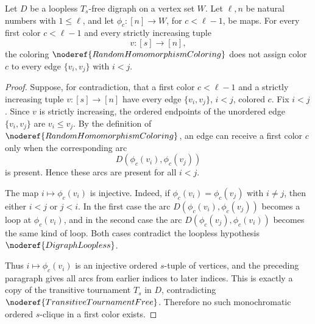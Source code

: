 \begin{helper}
Let \(D\) be a loopless \(T_s\)-free digraph on a vertex set \(W\).  Let
\(\ell,n\) be natural numbers with \(1\le\ell\), and let
\(\phi_c:[n]\to W\), for \(c<\ell-1\), be maps.  For every first color
\(c<\ell-1\) and every strictly increasing tuple
\[
  v:[s]\to[n],
\]
the coloring \(\noderef{RandomHomomorphismColoring}\) does not assign color
\(c\) to every edge \(\{v_i,v_j\}\) with \(i<j\).
\end{helper}
\begin{proof}
Suppose, for contradiction, that a first color \(c<\ell-1\) and a strictly
increasing tuple \(v:[s]\to[n]\) have every edge \(\{v_i,v_j\}\), \(i<j\),
colored \(c\).  Fix \(i<j\).  Since \(v\) is strictly increasing, the ordered
endpoints of the unordered edge \(\{v_i,v_j\}\) are \(v_i\le v_j\).  By the
definition of \(\noderef{RandomHomomorphismColoring}\), an edge can receive a
first color \(c\) only when the corresponding arc
\[
  D(\phi_c(v_i),\phi_c(v_j))
\]
is present.  Hence these arcs are present for all \(i<j\).

The map \(i\mapsto \phi_c(v_i)\) is injective.  Indeed, if
\(\phi_c(v_i)=\phi_c(v_j)\) with \(i\ne j\), then either \(i<j\) or \(j<i\).
In the first case the arc \(D(\phi_c(v_i),\phi_c(v_j))\) becomes a loop at
\(\phi_c(v_i)\), and in the second case the arc
\(D(\phi_c(v_j),\phi_c(v_i))\) becomes the same kind of loop.  Both cases
contradict the loopless hypothesis \(\noderef{DigraphLoopless}\).

Thus \(i\mapsto\phi_c(v_i)\) is an injective ordered \(s\)-tuple of vertices,
and the preceding paragraph gives all arcs from earlier indices to later
indices.  This is exactly a copy of the transitive tournament \(T_s\) in
\(D\), contradicting \(\noderef{TransitiveTournamentFree}\).  Therefore no
such monochromatic ordered \(s\)-clique in a first color exists.
\end{proof}
